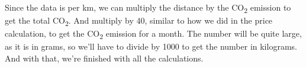 Since the data is per km, we can multiply the distance by the \unit{CO_{2}} emission to get the total \unit{CO_{2}}.
And multiply by 40, similar to how we did in the price calculation, to get the \unit{CO_{2}} emission for a month.
The number will be quite large, as it is in grams, so we'll have to divide by 1000 to get the number in kilograms.
And with that, we're finished with all the calculations.

